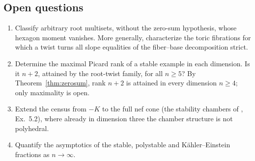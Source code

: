 \documentclass[11pt]{amsart}
\theoremstyle{definition}
\theoremstyle{remark}
\begin{document}
\subsection{Open questions}
\begin{enumerate}
\item Classify arbitrary root multisets, without the zero-sum hypothesis,
whose hexagon moment vanishes. More generally, characterize the toric
fibrations for which a twist
turns all slope equalities of the fiber--base decomposition strict.
\item Determine the maximal Picard rank of a stable example in each
dimension. Is it $n + 2$, attained by the root-twist family, for all
$n \ge 5$? By Theorem~\ref{thm:zerosum}, rank $n + 2$ is attained in
every dimension $n\ge4$; only maximality is open.
\item Extend the census from $-K$ to the full nef cone (the stability
chambers of \cite{HNS2022}, Ex.~5.2), where already in dimension three
the chamber structure is not polyhedral.
\item Quantify the asymptotics of the stable, polystable and
K\"ahler--Einstein fractions as $n \to \infty$.
\end{enumerate}
\end{document}
